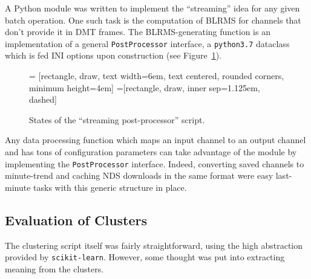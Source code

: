 \documentclass[colorlinks=true,pdfstartview=FitV,linkcolor=blue,
            citecolor=red,urlcolor=magenta]{ligodoc}
\begin{document}
A Python module was written to implement the ``streaming'' idea for any given batch operation.
One such task is the computation of BLRMS for channels that don't provide it in DMT frames.
The BLRMS-generating function is an implementation of a general \texttt{PostProcessor} interface, a \texttt{python3.7} dataclass which is fed INI options upon construction (see Figure~\ref{fig:pp}).
\begin{figure}[h]
   = [rectangle, draw, text width=6em, text centered, rounded corners, minimum height=4em]
   =[rectangle, draw, inner sep=1.125em, dashed]
  \caption{States of the ``streaming post-processor'' script.}\label{fig:pp}
\end{figure}

Any data processing function which maps an input channel to an output channel and has tons of configuration parameters can take advantage of the module by implementing the \texttt{PostProcessor} interface.
Indeed, converting saved channels to minute-trend and caching NDS downloads in the same format were easy last-minute tasks with this generic structure in place.

\subsection{Evaluation of Clusters}\label{ssec:eval}
The clustering script itself was fairly straightforward, using the high abstraction provided by \texttt{scikit-learn}.
However, some thought was put into extracting meaning from the clusters.
\end{document}
